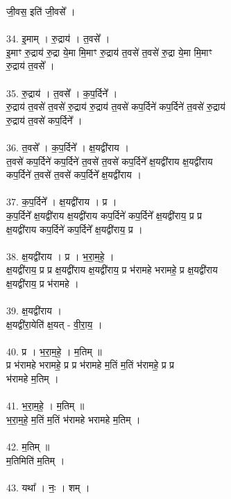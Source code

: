 जी॒वस॒ इति॑ जी॒वसे᳚ ।\\
\\
34. इ॒माम् । रु॒द्राय॑ । त॒वसे᳚ ।\\
इ॒माꣳ रु॒द्राय॑ रु॒द्रा ये॒मा मि॒माꣳ रु॒द्राय॑ त॒वसे॑ त॒वसे॑ रु॒द्रा ये॒मा मि॒माꣳ\\
रु॒द्राय॑ त॒वसे᳚ ।\\
\\
35. रु॒द्राय॑ । त॒वसे᳚ । क॒प॒र्दिने᳚ ।\\
रु॒द्राय॑ त॒वसे॑ त॒वसे॑ रु॒द्राय॑ रु॒द्राय॑ त॒वसे॑ कप॒र्दिने॑ कप॒र्दिने॑ त॒वसे॑ रु॒द्राय॑\\
रु॒द्राय॑ त॒वसे॑ कप॒र्दिने᳚ ।\\
\\
36. त॒वसे᳚ । क॒प॒र्दिने᳚ । क्ष॒यद्वी॑राय ।\\
त॒वसे॑ कप॒र्दिने॑ कप॒र्दिने॑ त॒वसे॑ त॒वसे॑ कप॒र्दिने᳚ क्ष॒यद्वी॑राय क्ष॒यद्वी॑राय\\
कप॒र्दिने॑ त॒वसे॑ त॒वसे॑ कप॒र्दिने᳚ क्ष॒यद्वी॑राय ।\\
\\
37. क॒प॒र्दिने᳚ । क्ष॒यद्वी॑राय । प्र ।\\
क॒प॒र्दिने᳚ क्ष॒यद्वी॑राय क्ष॒यद्वी॑राय कप॒र्दिने॑ कप॒र्दिने᳚ क्ष॒यद्वी॑राय॒ प्र प्र\\
क्ष॒यद्वी॑राय कप॒र्दिने॑ कप॒र्दिने᳚ क्ष॒यद्वी॑राय॒ प्र ।\\
\\
38. क्ष॒यद्वी॑राय । प्र । भ॒रा॒म॒हे॒ ।\\
क्ष॒यद्वी॑राय॒ प्र प्र क्ष॒यद्वी॑राय क्ष॒यद्वी॑राय॒ प्र भ॑रामहे भरामहे॒ प्र क्ष॒यद्वी॑राय\\
क्ष॒यद्वी॑राय॒ प्र भ॑रामहे ।\\
\\
39. क्ष॒यद्वी॑राय ।\\
क्ष॒यद्वी॑रा॒येति॑ क्ष॒यत् - वी॒रा॒य॒ ।\\
\\
40. प्र । भ॒रा॒म॒हे॒ । म॒तिम् ॥\\
प्र भ॑रामहे भरामहे॒ प्र प्र भ॑रामहे म॒तिं म॒तिं भ॑रामहे॒ प्र प्र\\
भ॑रामहे म॒तिम् ।\\
\\
41. भ॒रा॒म॒हे॒ । म॒तिम् ॥\\
भ॒रा॒म॒हे॒ म॒तिं म॒तिं भ॑रामहे भरामहे म॒तिम् ।\\
\\
42. म॒तिम् ॥\\
म॒तिमिति॑ म॒तिम् ।\\
\\
43. यथा᳚ । नः॒ । शम् ।\\
